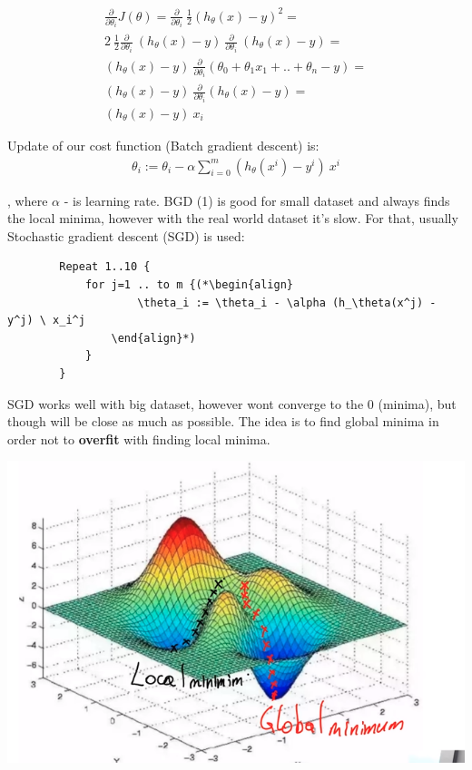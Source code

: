 \documentclass[11pt]{article}
\begin{document}
    \begin{gather*}
        \frac{\partial{}}{\partial{\theta_i}}J(\theta) = \frac{\partial{}}{\partial{\theta_i}} \
            \frac{1}{2}(h_\theta(x) - y)^2 = \\
            2 \ \frac{1}{2} \frac{\partial{}}{\partial{\theta_i}} \ (h_\theta(x) - y) \
            \frac{\partial{}}{\partial{\theta_i}} \ (h_\theta(x) - y) = \\
            (h_\theta(x) - y) \ \frac{\partial{}}{\partial{\theta_i}} (\theta_0 + \theta_1 x_1 + .. + \theta_n - y) = \\
            (h_\theta(x) - y) \ \frac{\partial{}}{\partial{\theta_i}} (h_\theta(x) - y) = \\
            (h_\theta(x) - y) \ x_i
    \end{gather*}

    Update of our cost function (Batch gradient descent) is:
    \begin{align}
        \theta_i := \theta_i - \alpha \sum_{i=0}^{m} (h_\theta(x^i) - y^i) \ x^i
    \end{align}

    , where $\alpha$ - is learning rate.
    BGD (1) is good for small dataset and always finds the local minima, however with the real world dataset it's slow.
    For that, usually Stochastic gradient descent (SGD) is used:

    \begin{lstlisting}
        Repeat 1..10 {
            for j=1 .. to m {(*\begin{align}
                    \theta_i := \theta_i - \alpha (h_\theta(x^j) - y^j) \ x_i^j
                \end{align}*)
            }
        }
    \end{lstlisting}

    SGD works well with big dataset, however wont converge to the 0 (minima), but though will be close as much as possible.
    The idea is to find global minima in order not to \textbf{overfit} with finding local minima.

    \includegraphics[scale=0.5]{sgd.png}
\end{document}
